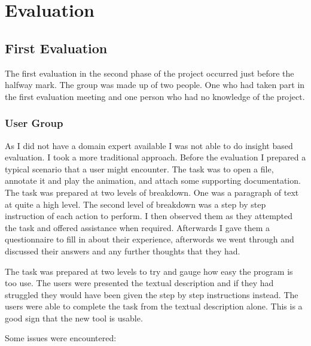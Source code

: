 \section{Evaluation}

\subsection{First Evaluation}

The first evaluation in the second phase of the project occurred just before the halfway mark.  The group was made up of two people.  One who had taken part in the first evaluation meeting and one person who had no knowledge of the project.

\subsubsection{User Group}

As I did not have a domain expert available I was not able to do insight based evaluation.  I took a more traditional approach.  Before the evaluation I prepared a typical scenario that a user might encounter.  The task was to open a file, annotate it and play the animation, and attach some supporting documentation.  The task was prepared at two levels of breakdown.  One was a paragraph of text at quite a high level.  The second level of breakdown was a step by step instruction of each action to perform.  I then observed them as they attempted the task and offered assistance when required.  Afterwards I gave them a questionnaire to fill in about their experience, afterwords we went through and discussed their answers and any further thoughts that they had.

The task was prepared at two levels to try and gauge how easy the program is too use.  The users were presented the textual description and if they had struggled they would have been given the step by step instructions instead.  The users were able to complete the task from the textual description alone.  This is a good sign that the new tool is usable.

Some issues were encountered:

